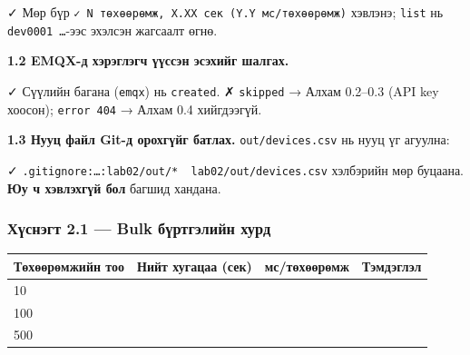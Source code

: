 ✓ Мөр бүр \texttt{✓\ N\ төхөөрөмж,\ X.\allowbreak{}XX\ сек\ (Y.\allowbreak{}Y\ мс/\allowbreak{}төхөөрөмж)} хэвлэнэ; \texttt{list} нь \texttt{dev0001\ \ldots{}}-ээс эхэлсэн жагсаалт өгнө.

\textbf{1.2 EMQX-д хэрэглэгч үүссэн эсэхийг шалгах.}

\begin{Shaded}
\begin{Highlighting}[]
\end{Highlighting}
\end{Shaded}

✓ Сүүлийн багана (\texttt{emqx}) нь \texttt{created}. ✗ \texttt{skipped} → Алхам 0.2--0.3 (API key хоосон); \texttt{error\ 404} → Алхам 0.4 хийгдээгүй.

\textbf{1.3 Нууц файл Git-д орохгүйг батлах.} \texttt{out/devices.csv} нь нууц үг агуулна:

\begin{Shaded}
\begin{Highlighting}[]
\end{Highlighting}
\end{Shaded}

✓ \texttt{.\allowbreak{}gitignore:\allowbreak{}\ldots{}:\allowbreak{}lab02/\allowbreak{}out/\allowbreak{}*\ \ lab02/\allowbreak{}out/\allowbreak{}devices.\allowbreak{}csv} хэлбэрийн мөр буцаана. \textbf{Юу ч хэвлэхгүй бол} багшид хандана.

\hypertarget{ux445ux4afux441ux43dux44dux433ux442-2.1-bulk-ux431ux4afux440ux442ux433ux44dux43bux438ux439ux43d-ux445ux443ux440ux434}{%
\subsubsection{Хүснэгт 2.1 --- Bulk бүртгэлийн хурд}\label{ux445ux4afux441ux43dux44dux433ux442-2.1-bulk-ux431ux4afux440ux442ux433ux44dux43bux438ux439ux43d-ux445ux443ux440ux434}}

\begingroup\scriptsize\begin{longtable}[]{@{}llll@{}}
\toprule
Төхөөрөмжийн тоо & Нийт хугацаа (сек) & мс/төхөөрөмж & Тэмдэглэл\tabularnewline
\midrule
\endhead
10 & & &\tabularnewline
100 & & &\tabularnewline
500 & & &\tabularnewline
\bottomrule
\end{longtable}\endgroup

